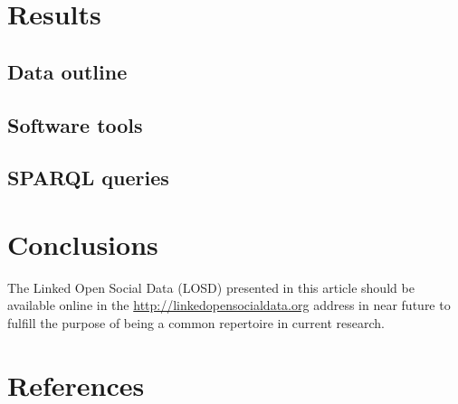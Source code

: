 \documentclass[review]{elsarticle}
\begin{document}
\section{Results}
\label{outline}
\subsection{Data outline}
\subsection{Software tools}
\subsection{SPARQL queries}\label{queries}

\section{Conclusions}
\label{conclusions}
The Linked Open Social Data (LOSD) presented in this article
should be available online in the \url{http://linkedopensocialdata.org}
address in near future to fulfill the purpose of being a common
repertoire in current research.

\section*{References}
%

%
%
\end{document}
